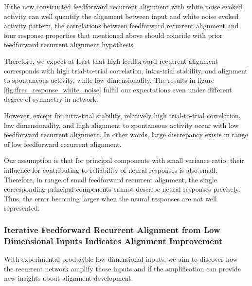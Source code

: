 \documentclass[11pt]{article}
\begin{document}
	If the new constructed feedforward recurrent alignment with white noise evoked activity can well quantify the alignment between input and white noise evoked activity pattern, the correlations between feedforward recurrent alignment and four response properties that mentioned above should coincide with prior feedforward recurrent alignment hypothesis. 
	
	Therefore, we expect at least that high feedforward recurrent alignment corresponds with high trial-to-trial correlation, intra-trial stability, and alignment to spontaneous activity, while low dimensionality. The results in figure \ref{fig:ffrec_response_white_noise} fulfill our expectations even under different degree of symmetry in network. 
	
	However, except for intra-trial stability, relatively high trial-to-trial correlation, low dimensionality, and high alignment to spontaneous activity occur with low feedforward recurrent alignment. In other words, large discrepancy exists in range of low feedforward recurrent alignment. 
	
	Our assumption is that for principal components with small variance ratio, their influence for contributing to reliability of neural responses is also small. Therefore, in range of small feedforward recurrent alignment, the single corresponding principal components cannot describe neural responses precisely. Thus, the error becoming larger when the neural responses are not well represented. 
	
	\subsubsection{Iterative Feedforward Recurrent Alignment from Low Dimensional Inputs Indicates Alignment Improvement}
	
	With experimental producible low dimensional inputs, we aim to discover how the recurrent network amplify those inputs and if the amplification can provide new insights about alignment development. 
	
\end{document}
